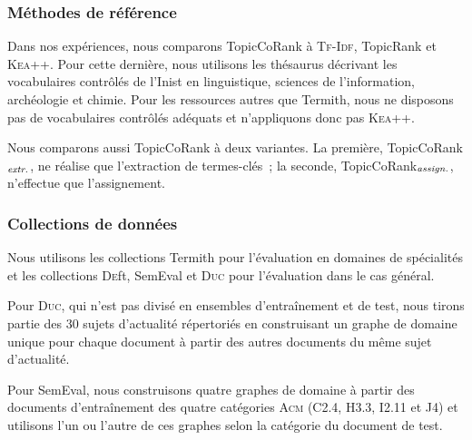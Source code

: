       \subsubsection{Méthodes de référence}
      \label{subsubsec:main-domain_specific_keyphrase_annotation-supervised_automatic_keyphrase_annotation-evaluation-baselines}
        Dans nos expériences, nous comparons TopicCoRank à \textsc{Tf-Idf},
        TopicRank et \textsc{Kea++}. Pour cette dernière, nous utilisons les
        thésaurus décrivant les vocabulaires contrôlés de l'Inist en
        linguistique, sciences de l'information, archéologie et chimie. Pour les
        ressources autres que Termith, nous ne disposons pas de vocabulaires
        contrôlés adéquats et n'appliquons donc pas \textsc{Kea++}.

        Nous comparons aussi TopicCoRank à deux variantes. La première,
        TopicCoRank$_\textnormal{\textit{extr.}}$, ne réalise que l'extraction
        de termes-clés~; la seconde,
        TopicCoRank$_\textnormal{\textit{assign.}}$, n'effectue que
        l'assignement.

      \subsubsection{Collections de données}
      \label{subsubsec:main-domain_specific_keyphrase_annotation-supervised_automatic_keyphrase_annotation-evaluation-evaluation_data}
        Nous utilisons les collections Termith pour l'évaluation en domaines de
        spécialités et les collections \textsc{De}ft, SemEval et \textsc{Duc}
        pour l'évaluation dans le cas général.
        
        Pour \textsc{Duc}, qui n'est pas divisé en ensembles d'entraînement et
        de test, nous tirons partie des 30 sujets d'actualité répertoriés en
        construisant un graphe \og{}de domaine\fg{} unique pour chaque document
        à partir des autres documents du même sujet d'actualité.
        
        Pour SemEval, nous construisons quatre graphes de domaine à partir des
        documents d'entraînement des quatre catégories \textsc{Acm} (C2.4, H3.3,
        I2.11 et J4) et utilisons l'un ou l'autre de ces graphes selon la
        catégorie du document de test. 
      
